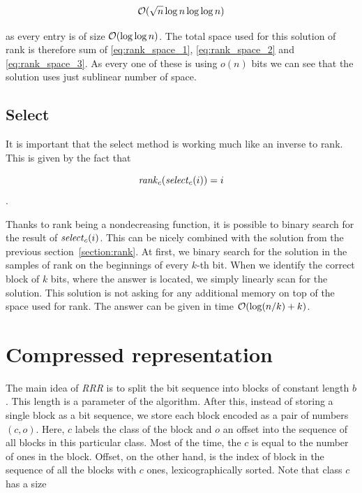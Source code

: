 \begin{equation}
    \mathcal{O}(\sqrt{n}\log n\log\log n)
    \label{eq:rank_space_3}
\end{equation}

as every entry is of size $\mathcal{O}(\log\log n)$. The total space used for this solution of rank
is therefore sum of \ref{eq:rank_space_1}, \ref{eq:rank_space_2} and \ref{eq:rank_space_3}.
As every one of these is using $o(n)$ bits we can see that the solution uses just sublinear
number of space.


\subsection{Select}
\label{section:select}

It is important that the select method is working much like an inverse to rank. This is given
by the fact that

                $$\mathit{rank}_c(\mathit{select}_c(i)) = i$$.

Thanks to rank being a nondecreasing function, it is possible to binary search for the result
of $\mathit{select}_c(i)$. This can be nicely combined with the solution from the previous
section~\ref{section:rank}. At first, we binary search for the solution in the samples of rank
on the beginnings of every $k$-th bit. When we identify the correct block of $k$ bits, where
the answer is located, we simply linearly scan for the solution. This solution is not asking
for any additional memory on top of the space used for rank. The answer can be given in time
$\mathcal{O}(\log(n/k)+k)$.


\section{Compressed representation}

The main idea of \textit{RRR} is to split the bit sequence into blocks of constant length $b$.
This length is a parameter of the algorithm. After this, instead
of storing a single block as a bit sequence, we store each block encoded as a pair
of numbers $(c, o)$. Here, $c$ labels the class of the block and $o$ an offset into
the sequence of all blocks in this particular class. Most of the time, the $c$ is equal
to the number of ones in the block. Offset, on the other hand, is the index of block in
the sequence of all the blocks with $c$ ones, lexicographically sorted. Note that
class $c$ has a size

